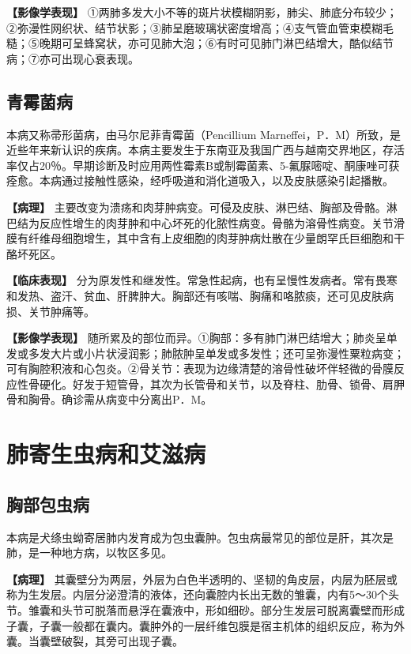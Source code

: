 \textbf{【影像学表现】}
①两肺多发大小不等的斑片状模糊阴影，肺尖、肺底分布较少；②弥漫性网织状、结节状影；③肺呈磨玻璃状密度增高；④支气管血管束模糊毛糙；⑤晚期可呈蜂窝状，亦可见肺大泡；⑥有时可见肺门淋巴结增大，酷似结节病；⑦亦可出现心衰表现。

\subsection{青霉菌病}

本病又称帚形菌病，由马尔尼菲青霉菌（Pencillium
Marneffei，P．M）所致，是近些年来新认识的疾病。本病主要发生于东南亚及我国广西与越南交界地区，存活率仅占20％。早期诊断及时应用两性霉素B或制霉菌素、5-氟脲嘧啶、酮康唑可获痊愈。本病通过接触性感染，经呼吸道和消化道吸入，以及皮肤感染引起播散。

\textbf{【病理】}
主要改变为溃疡和肉芽肿病变。可侵及皮肤、淋巴结、胸部及骨骼。淋巴结为反应性增生的肉芽肿和中心坏死的化脓性病变。骨骼为溶骨性病变。关节滑膜有纤维母细胞增生，其中含有上皮细胞的肉芽肿病灶散在少量朗罕氏巨细胞和干酪坏死区。

\textbf{【临床表现】}
分为原发性和继发性。常急性起病，也有呈慢性发病者。常有畏寒和发热、盗汗、贫血、肝脾肿大。胸部还有咳喘、胸痛和咯脓痰，还可见皮肤病损、关节肿痛等。

\textbf{【影像学表现】}
随所累及的部位而异。①胸部：多有肺门淋巴结增大；肺炎呈单发或多发大片或小片状浸润影；肺脓肿呈单发或多发性；还可呈弥漫性粟粒病变；可有胸腔积液和心包炎。②骨关节：表现为边缘清楚的溶骨性破坏伴轻微的骨膜反应性骨硬化。好发于短管骨，其次为长管骨和关节，以及脊柱、肋骨、锁骨、肩胛骨和胸骨。确诊需从病变中分离出P．M。

\section{肺寄生虫病和艾滋病}

\subsection{胸部包虫病}

本病是犬绦虫蚴寄居肺内发育成为包虫囊肿。包虫病最常见的部位是肝，其次是肺，是一种地方病，以牧区多见。

\textbf{【病理】}
其囊壁分为两层，外层为白色半透明的、坚韧的角皮层，内层为胚层或称为生发层。内层分泌澄清的液体，还向囊腔内长出无数的雏囊，内有5～30个头节。雏囊和头节可脱落而悬浮在囊液中，形如细砂。部分生发层可脱离囊壁而形成子囊，子囊一般都在囊内。囊肿外的一层纤维包膜是宿主机体的组织反应，称为外囊。当囊壁破裂，其旁可出现子囊。

